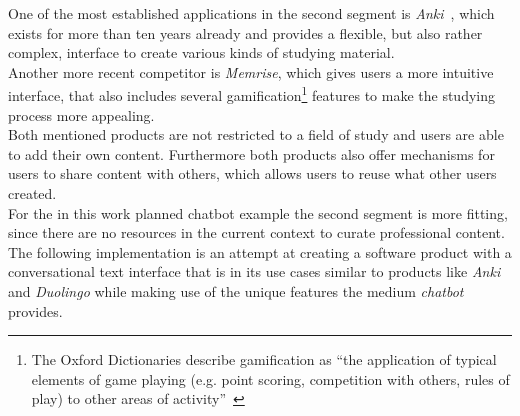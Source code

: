 One of the most established applications in the second segment is \emph{Anki}~\cite{lifehacker},
which exists for more than ten years already and provides a flexible,
but also rather complex, interface to create various kinds of studying material.
\\
Another more recent competitor is \emph{Memrise}, which gives users a more intuitive interface, that also includes several gamification\footnote{The Oxford Dictionaries describe gamification as ``the application of typical elements of game playing (e.g. point scoring, competition with others, rules of play) to other areas of activity''~\cite{oxfordgamification}} features to make the studying process more appealing.
\\

Both mentioned products are not restricted to a field of study and users are able to add their own content.
Furthermore both products also offer mechanisms for users to share content with others, which allows users to reuse what other users created.
\\

For the in this work planned chatbot example the second segment is more fitting, since there are no resources in the current context to curate professional content.
\\

The following implementation is an attempt at creating a software product with a conversational text interface that is in its use cases similar to products like \emph{Anki} and \emph{Duolingo} while making use of the unique features the medium \emph{chatbot} provides.
